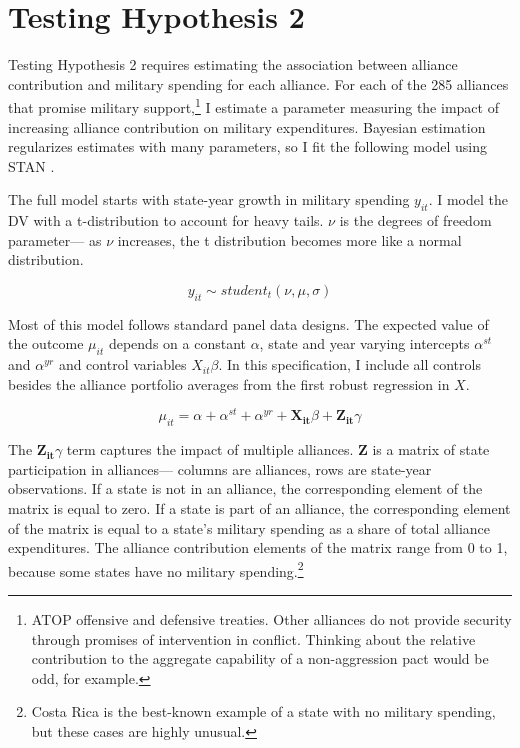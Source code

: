 \documentclass[12pt]{article}
\begin{document}
\section{Testing Hypothesis 2}


Testing Hypothesis 2 requires estimating the association between alliance contribution and military spending for each alliance.
For each of the 285 alliances that promise military support,\footnote{ATOP offensive and defensive treaties. Other alliances do not provide security through promises of intervention in conflict. Thinking about the relative contribution to the aggregate capability of a non-aggression pact would be odd, for example.} I estimate a parameter measuring the impact of increasing alliance contribution on military expenditures. 
Bayesian estimation regularizes estimates with many parameters, so I fit the following model using STAN \citep{Carpenteretal2016}.


The full model starts with state-year growth in military spending $y_{it}$.
I model the DV with a t-distribution to account for heavy tails.
$\nu$ is the degrees of freedom parameter--- as $\nu$ increases, the t distribution becomes more like a normal distribution. 


\begin{equation}
y_{it} \sim student_t(\nu, \mu, \sigma) 
\end{equation}


Most of this model follows standard panel data designs.
The expected value of the outcome $\mu_{it}$ depends on a constant $\alpha$, state and year varying intercepts $\alpha^{st}$ and $\alpha^{yr}$ and control variables $X_{it} \beta$. 
In this specification, I include all controls besides the alliance portfolio averages from the first robust regression in $X$.


\begin{equation}
\mu_{it} = \alpha + \alpha^{st} + \alpha^{yr} + \mathbf{X_{it}} \beta + \mathbf{Z_{it}} \gamma 
\end{equation}


The $\mathbf{Z_{it}} \gamma$ term captures the impact of multiple alliances. 
\textbf{Z} is a matrix of state participation in alliances--- columns are alliances, rows are state-year observations. 
If a state is not in an alliance, the corresponding element of the matrix is equal to zero. 
If a state is part of an alliance, the corresponding element of the matrix is equal to a state's military spending as a share of total alliance expenditures. 
The alliance contribution elements of the matrix range from 0 to 1, because some states have no military spending.\footnote{Costa Rica is the best-known example of a state with no military spending, but these cases are highly unusual.} 
\end{document}
